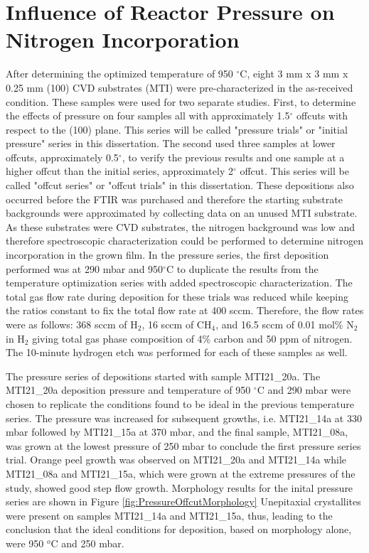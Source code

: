\section{Influence of Reactor Pressure on Nitrogen Incorporation}
\label{pressureSeries}
\indent

After determining the optimized temperature of 950 $^{\circ}$C, eight 3 mm x 3 mm x 0.25 mm (100) CVD substrates (MTI) were pre-characterized in the as-received condition. These samples were used for two separate studies. First, to determine the effects of pressure on four samples all with approximately 1.5$^{\circ}$ offcuts with respect to the (100) plane. This series will be called "pressure trials" or "initial pressure" series in this dissertation. The second used three samples at lower offcuts, approximately 0.5$^\circ$, to verify the previous results and one sample at a higher offcut than the initial series, approximately 2$^{\circ}$ offcut. This series will be called "offcut series" or "offcut trials" in this dissertation. These depositions also occurred before the FTIR was purchased and therefore the starting substrate backgrounds were approximated by collecting data on an unused MTI substrate. As these substrates were CVD substrates, the nitrogen background was low and therefore spectroscopic characterization could be performed to determine nitrogen incorporation in the grown film. In the pressure series, the first deposition performed was at 290 mbar and 950$^\circ$C to duplicate the results from the temperature optimization series with added spectroscopic characterization. The total gas flow rate during deposition for these trials was reduced while keeping the ratios constant to fix the total flow rate at 400 sccm. Therefore, the flow rates were as follows: 368 sccm of H$_2$, 16 sccm of CH$_4$, and 16.5 sccm of 0.01 mol\% N$_2$ in H$_2$ giving total gas phase composition of 4\% carbon and 50 ppm of nitrogen. The 10-minute hydrogen etch was performed for each of these samples as well.
	
The pressure series of depositions started with sample MTI21\_20a. The MTI21\_20a deposition pressure and temperature of 950 $^{\circ}$C and 290 mbar were chosen to replicate the conditions found to be ideal in the previous temperature series. The pressure was increased for subsequent growths, i.e. MTI21\_14a at 330 mbar followed by MTI21\_15a at 370 mbar, and the final sample, MTI21\_08a, was grown at the lowest pressure of 250 mbar to conclude the first pressure series trial. Orange peel growth was observed on MTI21\_20a and MTI21\_14a while MTI21\_08a and MTI21\_15a, which were grown at the extreme pressures of the study, showed good step flow growth. Morphology results for the inital pressure series are shown in Figure \ref{fig:PressureOffcutMorphology} Unepitaxial crystallites were present on samples MTI21\_14a and MTI21\_15a, thus, leading to the conclusion that the ideal conditions for deposition, based on morphology alone, were 950 $^o$C and 250 mbar. 

